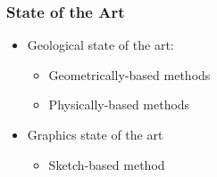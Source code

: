 \documentclass{beamer}
\begin{document}
	\begin{frame}
	\frametitle{State of the Art}
	\begin{itemize}
	\item Geological state of the art:
		\begin{itemize}
		\item Geometrically-based methods
		\item Physically-based methods
		\end{itemize}
	\item Graphics state of the art
		\begin{itemize}
		\item Sketch-based method
		\end{itemize}
	\end{itemize}
    \end{frame}
\end{document}
